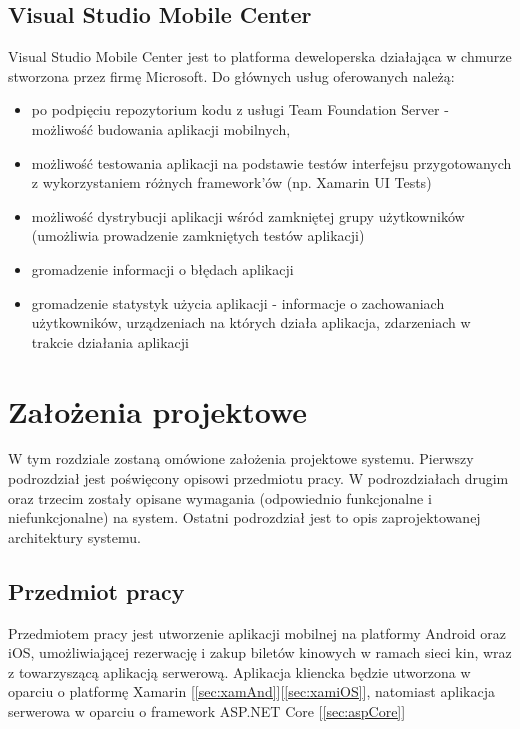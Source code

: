 \section{Visual Studio Mobile Center}
\label{sec:hockeyapp}
Visual Studio Mobile Center jest to platforma deweloperska działająca w chmurze stworzona przez firmę Microsoft. Do głównych usług oferowanych należą:
\begin{itemize}
\item po podpięciu repozytorium kodu z usługi Team Foundation Server - możliwość budowania aplikacji mobilnych,
\item możliwość testowania aplikacji na podstawie testów interfejsu przygotowanych z wykorzystaniem różnych framework'ów (np. Xamarin UI Tests)
\item możliwość dystrybucji aplikacji wśród zamkniętej grupy użytkowników (umożliwia prowadzenie zamkniętych testów aplikacji)
\item gromadzenie informacji o błędach aplikacji
\item gromadzenie statystyk użycia aplikacji - informacje o zachowaniach użytkowników, urządzeniach na których działa aplikacja, zdarzeniach w trakcie działania aplikacji
\end{itemize}
\chapter{Założenia projektowe}
\label{zal}
W tym rozdziale zostaną omówione założenia projektowe systemu. Pierwszy podrozdział jest poświęcony opisowi przedmiotu pracy. W podrozdziałach drugim oraz trzecim zostały opisane wymagania (odpowiednio funkcjonalne i niefunkcjonalne) na system. Ostatni podrozdział jest to opis zaprojektowanej architektury systemu.
\section{Przedmiot pracy}
Przedmiotem pracy jest utworzenie aplikacji mobilnej na platformy Android oraz iOS, umożliwiającej rezerwację i zakup biletów kinowych w ramach sieci kin, wraz z towarzyszącą aplikacją serwerową. Aplikacja kliencka będzie utworzona w oparciu o platformę Xamarin [\ref{sec:xamAnd}][\ref{sec:xamiOS}], natomiast aplikacja serwerowa w oparciu o framework ASP.NET Core [\ref{sec:aspCore}]
